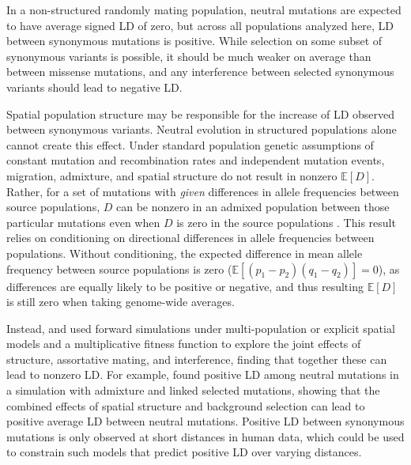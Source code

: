 \documentclass[]{article}
\newcommand{\E}{\mathbb{E}}
\begin{document}
In a non-structured randomly mating population, neutral mutations are expected to have
average signed LD of zero, but across all populations analyzed here, LD between
synonymous mutations is positive. While selection on some subset of synonymous
variants is possible, it should be much weaker on average than between missense
mutations, and any interference between selected synonymous variants should
lead to negative LD.

Spatial population structure may be responsible for the increase of LD observed
between synonymous variants. Neutral evolution in structured populations alone
cannot create this effect. Under standard population genetic assumptions of
constant mutation and recombination rates and independent mutation events,
migration, admixture, and spatial structure do not result in nonzero \(\E[D]\).
Rather, for a set of mutations with \emph{given} differences in allele
frequencies between source populations, \(D\) can be nonzero in an admixed
population between those particular mutations even when \(D\) is zero in the
source populations \citep{Cavalli-Sforza1971-jv}. This result relies on
conditioning on directional differences in allele frequencies between
populations. Without conditioning, the expected difference in mean allele
frequency between source populations is zero (\(\E[(p_1-p_2)(q_1-q_2)] = 0\)),
as differences are equally likely to be positive or negative, and thus
resulting \(\E[D]\) is still zero when taking genome-wide averages.

Instead, \citet{Sohail2017-zq} and \citet{Sandler2021-of} used forward
simulations under multi-population or explicit spatial models and a
multiplicative fitness function to explore the joint effects of structure,
assortative mating, and interference, finding that together these can lead to
nonzero LD. For example, \citet{Sandler2021-of} found positive LD among neutral
mutations in a simulation with admixture and linked selected mutations, showing
that the combined effects of spatial structure and background selection can
lead to positive average LD between neutral mutations. Positive LD between
synonymous mutations is only observed at short distances in human data, which
could be used to constrain such models that predict positive LD over varying
distances.
\end{document}
